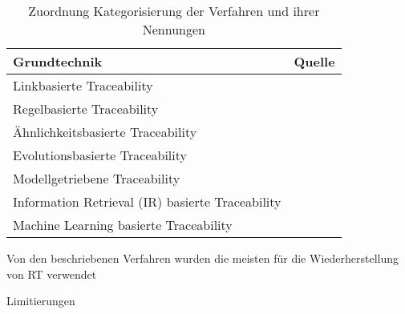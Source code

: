 \begin{table}[!ht]
\renewcommand{\arraystretch}{1.3}
\centering
\begin{threeparttable}
\begin{tabularx}{\columnwidth}{@{}Xl@{}}
\toprule
Grundtechnik & Quelle  \\ \midrule
Linkbasierte Traceability & \cite{Javed2014ACode, Spanoudakis2004Rule-basedRelations,  Omoronyia2011ExploringTraceability} \\
Regelbasierte Traceability & \cite{Javed2014ACode, Ghabi2015ExploitingCode, Lago2009AManagement, Mader2012TowardsMaintenance, Mder2007CustomizingProcess, Spanoudakis2004Rule-basedRelations}  \\
Ähnlichkeitsbasierte Traceability & \cite{Tsuchiya2015InteractiveLogs, Omoronyia2011ExploringTraceability, Leuser2010TacklingSpecifications, Spanoudakis2004Rule-basedRelations} \\
Evolutionsbasierte Traceability & \cite{Javed2014ACode, Mader2012TowardsMaintenance} \\
Modellgetriebene Traceability & \cite{Javed2014ACode,Lago2009AManagement, Mader2012TowardsMaintenance, Mder2007CustomizingProcess, Mader2009EnablingRelations, Spanoudakis2004Rule-basedRelations} \\
Information Retrieval (IR) basierte Traceability & \cite{Javed2014ACode, Bavota2014EnhancingInformation, Saputri2016EnsuringApproach, Leuser2010TacklingSpecifications, Merten2016DoData} \\
Machine Learning basierte Traceability & \cite{Javed2014ACode} \\
\bottomrule
\end{tabularx}
\medskip
\end{threeparttable}
\caption{Zuordnung Kategorisierung der Verfahren und ihrer Nennungen}
\label{tab:auswertung_verfahren_kategorisierung}
\end{table}


Von den beschriebenen Verfahren wurden die meisten für die Wiederherstellung von RT verwendet

Limitierungen

